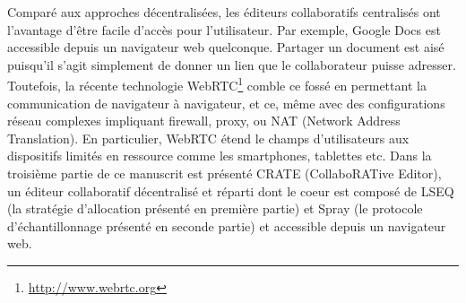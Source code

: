 Comparé aux approches décentralisées, les éditeurs collaboratifs centralisés ont
l'avantage d'être facile d'accès pour l'utilisateur. Par exemple, Google Docs
est accessible depuis un navigateur web quelconque. Partager un document est
aisé puisqu'il s'agit simplement de donner un lien que le collaborateur puisse
adresser. Toutefois, la récente technologie
WebRTC\footnote{\url{http://www.webrtc.org}} comble ce fossé en permettant la
communication de navigateur à navigateur, et ce, même avec des configurations
réseau complexes impliquant firewall, proxy, ou NAT (Network Address
Translation). En particulier, WebRTC étend le champs d'utilisateurs aux
dispositifs limités en ressource comme les smartphones, tablettes etc. Dans la
troisième partie de ce manuscrit est présenté CRATE (CollaboRATive Editor), un
éditeur collaboratif décentralisé et réparti dont le coeur est composé de LSEQ
(la stratégie d'allocation présenté en première partie) et Spray (le protocole
d'échantillonnage présenté en seconde partie) et accessible depuis un navigateur
web.

